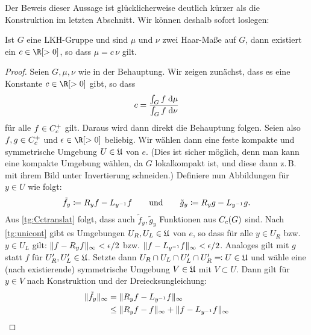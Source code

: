 
\bigskip
\noindent
Der Beweis dieser Aussage ist glücklicherweise deutlich kürzer als die
Konstruktion im letzten Abschnitt. Wir können deshalb sofort loslegen: 

\begin{thSatz}
    \label{pf:uniqueness}
    Ist $G$ eine LKH-Gruppe und sind $\mu$ und $\nu$ zwei Haar-Maße auf $G$,
    dann existiert ein $c\in\R[>0]$, so dass $\mu = c\,\nu$ gilt.
\end{thSatz}

\begin{proof}
    Seien $G,\mu,\nu$ wie in der Behauptung. Wir zeigen zunächst, dass es eine
    Konstante $c\in\R[>0]$ gibt, so dass
    \[ c = \frac{\int_G f \;\mathrm{d} \mu}{\int_G f \;\mathrm{d} \nu} \]
    für alle $f\in C_c^+$ gilt. Daraus wird dann direkt die Behauptung
    folgen. Seien also $f,g\in C_c^+$ und $\epsilon\in\R[>0]$
    beliebig. Wir wählen dann eine feste kompakte und symmetrische Umgebung
    $U\in\mathfrak{U}$ von $e$. (Dies ist sicher möglich, denn man kann eine
    kompakte Umgebung wählen, da $G$ lokalkompakt ist, und diese dann z.\,B. mit
    ihrem Bild unter Invertierung schneiden.) 
    Definiere nun Abbildungen für $y\in U$ wie folgt:
    \[  \tilde f_y \coloneqq R_yf - L_{y^{-1}}f
        \qquad\text{und}\qquad
        \tilde g_y \coloneqq R_yg - L_{y^{-1}}g
    . \]
    Aus \cref{tg:Cctranslat} folgt, dass auch $\tilde f_y,\tilde g_y$ Funktionen
    aus $C_c(G)$ sind. Nach \cref{tg:unicont} gibt es Umgebungen
    $U_R,U_L\in\mathfrak{U}$ von $e$, so dass für alle $y\in U_R$ bzw. $y\in U_L$
    gilt: 
    $\lVert f-R_yf\rVert_\infty<\epsilon/2$ bzw. $\lVert f-L_{y^{-1}}f\rVert_\infty<\epsilon/2$.
    Analoges gilt mit $g$ statt $f$ für $U_R',U_L'\in\mathfrak{U}$.
    Setzte dann $U_R\cap U_L\cap U_L'\cap U_R' \eqqcolon U \in\mathfrak{U}$
    und wähle eine (nach  existierende) symmetrische
    Umgebung $V\in\mathfrak{U}$ mit $V\subset U$. Dann gilt für $y\in V$ nach
    Konstruktion und der Dreiecksungleichung:
    \begin{align*}
        \supnorm{ \tilde f_y }                                          %
        &=    \supnorm{ R_yf - L_{y^{-1}}f }                            \\
        &\leq \supnorm{ R_yf - f } + \supnorm{ f - L_{y^{-1}}f }        \\

\end{align*}
\end{proof}
